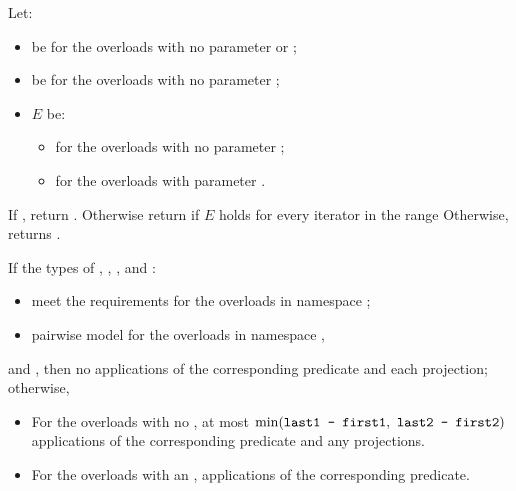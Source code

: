 \begin{itemdescr}
\pnum
Let:
\begin{itemize}
\item
   be 
  for the overloads with no parameter  or ;
\item
   be 
  for the overloads with no parameter ;
\item
  $E$ be:
  \begin{itemize}
  \setlength{\emergencystretch}{1em}
  \item
    for the overloads with no parameter ;
  \item
    for the overloads with parameter .
  \end{itemize}
\end{itemize}

\pnum
\returns
If , return .
Otherwise return 
if $E$ holds for every iterator  in the range 
Otherwise, returns .

\pnum
\complexity
If the types of , , , and :
\begin{itemize}
\item
  meet the
   requirements
  for the overloads in namespace ;
\item
  pairwise model 
  for the overloads in namespace ,
\end{itemize}
and ,
then no applications of the corresponding predicate and each projection;
otherwise,
\begin{itemize}
\item
  For the overloads with no ,
  at most $\min(\texttt{last1 - first1}, \ \texttt{last2 - first2})$
  applications of the corresponding predicate and any projections.
\item
  For the overloads with an ,
  applications of the corresponding predicate.
\end{itemize}
\end{itemdescr}

